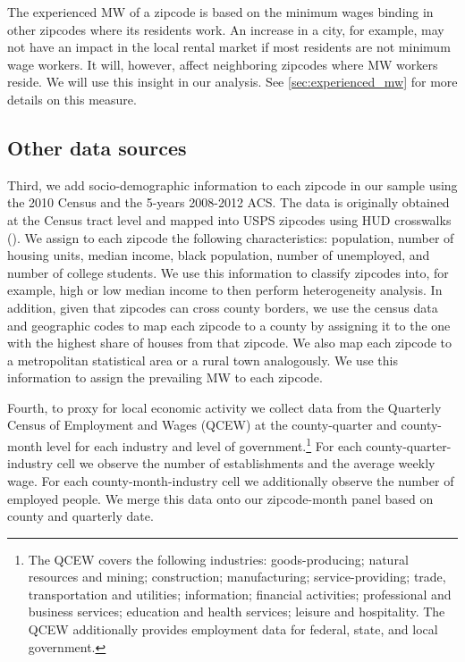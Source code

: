 The experienced MW of a zipcode is based on the minimum wages binding in other zipcodes 
where its residents work. An increase in a city, for example, may not have an impact in the 
local rental market if most residents are not minimum wage workers. It will, however, affect 
neighboring zipcodes where MW workers reside. We will use this insight in our analysis. See 
\autoref{sec:experienced_mw} for more details on this measure.

\subsection{Other data sources}


Third, we add socio-demographic information to each zipcode in our sample using the 2010 Census 
and the 5-years 2008-2012 ACS. The data is originally obtained at the Census tract level and mapped 
into USPS zipcodes using HUD crosswalks (\citeyear{hud}).
We assign to each zipcode the following characteristics: population, number of housing units, 
median income, black population, number of unemployed, and number of college students. We use 
this information to classify zipcodes into, for example, high or low median income to then perform 
heterogeneity analysis. In addition, given that zipcodes can cross county borders, we use the 
census data and geographic codes to map each zipcode to a county by assigning it to the one 
with the highest share of houses from that zipcode. We also map each zipcode to a metropolitan 
statistical area or a rural town analogously. We use this information to assign the prevailing 
MW to each zipcode.



Fourth, to proxy for local economic activity we collect data from the Quarterly Census of Employment 
and Wages (QCEW) at the county-quarter and county-month level for each industry and level of 
government.\footnote{The QCEW covers the following industries: goods-producing; natural resources and 
	mining; construction; manufacturing; service-providing; trade, transportation and utilities; 
	information; financial activities; professional and business services; education and health 
	services; leisure and hospitality. The QCEW additionally provides employment data for federal, 
	state, and local government.} 
For each county-quarter-industry cell we observe the number of establishments and the average weekly 
wage. For each county-month-industry cell we additionally observe the number of employed people. We 
merge this data onto our zipcode-month panel based on county and quarterly date.

